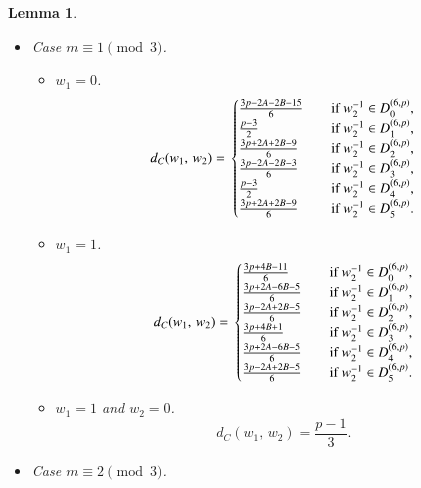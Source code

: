 \documentclass[letter]{ieice}
\newtheorem{sec3_lemma7}[sec3_lemma1]{Lemma}
\begin{document}
\begin{sec3_lemma7}
\begin{itemize}
\begin{itemize}
\begin{equation*}
d_{\mathit{C}}(w_{1},\,w_{2})=\frac{p-1}{3}.
\end{equation*}
\end{itemize}                           
\item Case $ m\equiv 1 \pmod 3 $.
\begin{itemize}
\item $ w_{1}=0 $.
\begin{equation*}
d_{\mathit{C}}(w_{1},\,w_{2})=\\
\begin{cases}
\frac{3p-2A-2B-15}{6}&\quad \mbox{if}\  w^{-1}_{2} \in  D_{0}^{(6,p)},\\
\frac{p-3}{2}&\quad \mbox{if}\  w^{-1}_{2} \in  D_{1}^{(6,p)},\\
\frac{3p+2A+2B-9}{6}&\quad \mbox{if}\  w^{-1}_{2} \in  D_{2}^{(6,p)},\\
\frac{3p-2A-2B-3}{6}&\quad \mbox{if}\  w^{-1}_{2} \in  D_{3}^{(6,p)},\\
\frac{p-3}{2}&\quad \mbox{if}\  w^{-1}_{2} \in  D_{4}^{(6,p)},\\
\frac{3p+2A+2B-9}{6}&\quad \mbox{if}\  w^{-1}_{2} \in  D_{5}^{(6,p)}.
\end{cases}
\end{equation*}
\item $ w_{1}=1 $.
\begin{equation*}
d_{\mathit{C}}(w_{1},\,w_{2})=\\
\begin{cases}
\frac{3p+4B-11}{6}&\quad \mbox{if}\  w^{-1}_{2} \in  D_{0}^{(6,p)},\\
\frac{3p+2A-6B-5}{6}&\quad \mbox{if}\  w^{-1}_{2} \in  D_{1}^{(6,p)},\\
\frac{3p-2A+2B-5}{6}&\quad \mbox{if}\  w^{-1}_{2} \in  D_{2}^{(6,p)},\\
\frac{3p+4B+1}{6}&\quad \mbox{if}\  w^{-1}_{2} \in  D_{3}^{(6,p)},\\
\frac{3p+2A-6B-5}{6}&\quad \mbox{if}\  w^{-1}_{2} \in  D_{4}^{(6,p)},\\
\frac{3p-2A+2B-5}{6}&\quad \mbox{if}\  w^{-1}_{2} \in  D_{5}^{(6,p)}.
\end{cases} 
\end{equation*}
\item $ w_{1}=1 $ and $ w_{2}=0 $.
\begin{equation*}
d_{\mathit{C}}(w_{1},\,w_{2})=\frac{p-1}{3}.
\end{equation*}
\end{itemize}                    
\item Case $ m\equiv 2 \pmod 3 $.

\end{itemize}
\end{sec3_lemma7}
\end{document}
